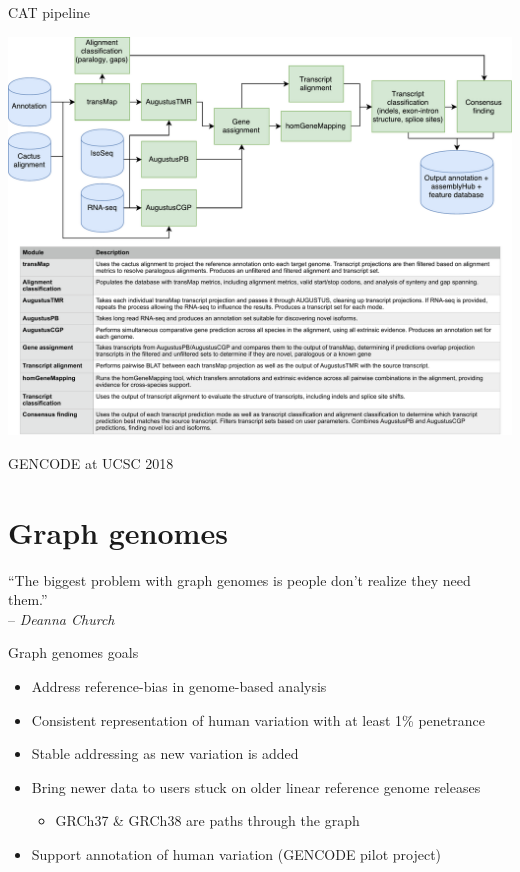 \documentclass[10pt,
               hyperref={bookmarks=false,
                         bookmarksopen=false,
                         colorlinks=true,
                         linkcolor=blue,
                         urlcolor=blue},
               xcolor={svgnames,table}]{beamer}
\newenvironment{tightitemize}{%
\begin{itemize}
  \setlength{\itemsep}{1pt}%
  \setlength{\parskip}{0pt}%
  \setlength{\parsep}{0pt}%
}{\end{itemize}}
\newcommand{\thetitle}{GENCODE at UCSC 2018}
\begin{document}
\begin{frame}{CAT pipeline}
  \begin{center}
    \includegraphics[scale=0.38]{images/CAT_pipeline.pdf}
  \end{center}
\end{frame}

\begin{frame}{\thetitle}
  \section{Graph genomes}
  {\large
  ``The biggest problem with graph genomes is people don't realize they need them.'' \\
  -- \textit{Deanna Church}}
\end{frame}

\begin{frame}{Graph genomes goals}
  \begin{itemize}
  \item Address reference-bias in genome-based analysis
  \item Consistent representation of human variation with at least 1\% penetrance
  \item Stable addressing as new variation is added
  \item Bring newer data to users stuck on older linear reference genome releases
    \begin{tightitemize}
    \item GRCh37 \& GRCh38 are paths through the graph
    \end{tightitemize}
  \item Support annotation of human variation (GENCODE pilot project)
  \end{itemize}
\end{frame}
\end{document}
